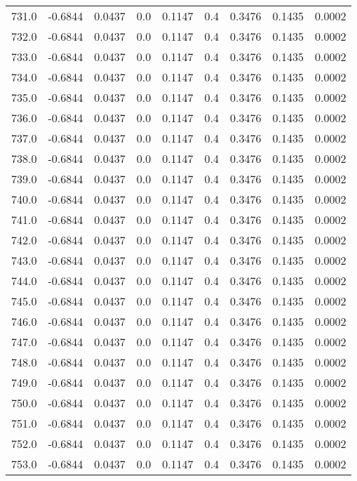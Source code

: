 \begin{longtable}{lrrrrrrrr}
731.0 & -0.6844 & 0.0437 & 0.0 & 0.1147 & 0.4 & 0.3476 & 0.1435 & 0.0002 \\
732.0 & -0.6844 & 0.0437 & 0.0 & 0.1147 & 0.4 & 0.3476 & 0.1435 & 0.0002 \\
733.0 & -0.6844 & 0.0437 & 0.0 & 0.1147 & 0.4 & 0.3476 & 0.1435 & 0.0002 \\
734.0 & -0.6844 & 0.0437 & 0.0 & 0.1147 & 0.4 & 0.3476 & 0.1435 & 0.0002 \\
735.0 & -0.6844 & 0.0437 & 0.0 & 0.1147 & 0.4 & 0.3476 & 0.1435 & 0.0002 \\
736.0 & -0.6844 & 0.0437 & 0.0 & 0.1147 & 0.4 & 0.3476 & 0.1435 & 0.0002 \\
737.0 & -0.6844 & 0.0437 & 0.0 & 0.1147 & 0.4 & 0.3476 & 0.1435 & 0.0002 \\
738.0 & -0.6844 & 0.0437 & 0.0 & 0.1147 & 0.4 & 0.3476 & 0.1435 & 0.0002 \\
739.0 & -0.6844 & 0.0437 & 0.0 & 0.1147 & 0.4 & 0.3476 & 0.1435 & 0.0002 \\
740.0 & -0.6844 & 0.0437 & 0.0 & 0.1147 & 0.4 & 0.3476 & 0.1435 & 0.0002 \\
741.0 & -0.6844 & 0.0437 & 0.0 & 0.1147 & 0.4 & 0.3476 & 0.1435 & 0.0002 \\
742.0 & -0.6844 & 0.0437 & 0.0 & 0.1147 & 0.4 & 0.3476 & 0.1435 & 0.0002 \\
743.0 & -0.6844 & 0.0437 & 0.0 & 0.1147 & 0.4 & 0.3476 & 0.1435 & 0.0002 \\
744.0 & -0.6844 & 0.0437 & 0.0 & 0.1147 & 0.4 & 0.3476 & 0.1435 & 0.0002 \\
745.0 & -0.6844 & 0.0437 & 0.0 & 0.1147 & 0.4 & 0.3476 & 0.1435 & 0.0002 \\
746.0 & -0.6844 & 0.0437 & 0.0 & 0.1147 & 0.4 & 0.3476 & 0.1435 & 0.0002 \\
747.0 & -0.6844 & 0.0437 & 0.0 & 0.1147 & 0.4 & 0.3476 & 0.1435 & 0.0002 \\
748.0 & -0.6844 & 0.0437 & 0.0 & 0.1147 & 0.4 & 0.3476 & 0.1435 & 0.0002 \\
749.0 & -0.6844 & 0.0437 & 0.0 & 0.1147 & 0.4 & 0.3476 & 0.1435 & 0.0002 \\
750.0 & -0.6844 & 0.0437 & 0.0 & 0.1147 & 0.4 & 0.3476 & 0.1435 & 0.0002 \\
751.0 & -0.6844 & 0.0437 & 0.0 & 0.1147 & 0.4 & 0.3476 & 0.1435 & 0.0002 \\
752.0 & -0.6844 & 0.0437 & 0.0 & 0.1147 & 0.4 & 0.3476 & 0.1435 & 0.0002 \\
753.0 & -0.6844 & 0.0437 & 0.0 & 0.1147 & 0.4 & 0.3476 & 0.1435 & 0.0002 \\

\end{longtable}
